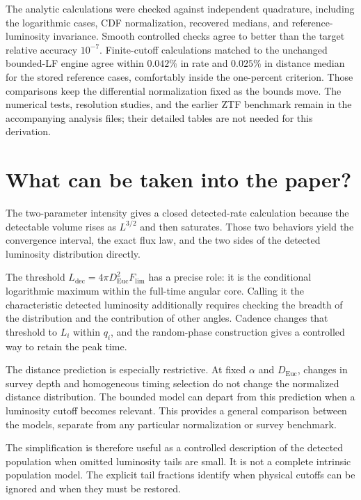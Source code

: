 \documentclass[11pt,a4paper]{article}
\newcommand{\Euc}{\mathrm{Euc}}
\newcommand{\Flim}{F_{\mathrm{lim}}}
\newcommand{\Ldec}{L_{\mathrm{dec}}}
\begin{document}
The analytic calculations were checked against independent quadrature,
including the logarithmic cases, CDF normalization, recovered medians, and
reference-luminosity invariance. Smooth controlled checks agree to better
than the target relative accuracy $10^{-7}$. Finite-cutoff calculations
matched to the unchanged bounded-LF engine agree within $0.042\%$ in rate
and $0.025\%$ in distance median for the stored reference cases, comfortably
inside the one-percent criterion. Those comparisons keep the differential
normalization fixed as the bounds move.
The numerical tests, resolution studies, and the earlier ZTF benchmark
remain in the accompanying analysis files; their detailed tables are not
needed for this derivation.

\section{What can be taken into the paper?}
The two-parameter intensity gives a closed detected-rate calculation because
the detectable volume rises as $L^{3/2}$ and then saturates. Those two
behaviors yield the convergence interval, the exact flux law, and the two
sides of the detected luminosity distribution directly.

The threshold $\Ldec=4\pi D_\Euc^2\Flim$ has a precise role: it is the
conditional logarithmic maximum within the full-time angular core.
Calling it the characteristic detected luminosity additionally requires
checking the breadth of the distribution and the contribution of other
angles. Cadence changes that threshold to $L_i$ within $q_i$, and the
random-phase construction gives a controlled way to retain the peak time.

The distance prediction is especially restrictive. At fixed $\alpha$ and
$D_\Euc$, changes in survey depth and homogeneous timing selection do not
change the normalized distance distribution. The bounded model can depart
from this prediction when a luminosity cutoff becomes relevant. This
provides a general comparison between the models, separate from any
particular normalization or survey benchmark.

The simplification is therefore useful as a controlled description of the
detected population when omitted luminosity tails are small. It is not a
complete intrinsic population model. The explicit tail fractions identify
when physical cutoffs can be ignored and when they must be restored.

\appendix
\end{document}

